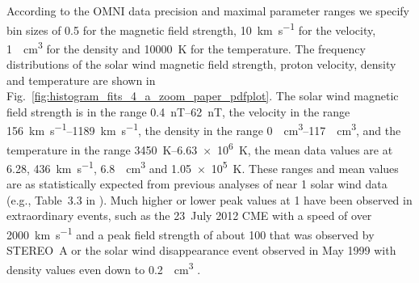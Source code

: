 According to the OMNI data precision and maximal parameter ranges we specify bin sizes of \SI{0.5}{\nT} for the magnetic field strength, \SI{10}{\km\per\s} for the velocity, \SI{1}{\per\cm\cubed} for the density and \SI{10000}{\K} for the temperature. The frequency distributions of the solar wind magnetic field strength, proton velocity, density and temperature are shown in Fig.~\ref{fig:histogram_fits_4_a_zoom_paper_pdfplot}.
The solar wind magnetic field strength is in the range \SIrange{0.4}{62}{nT}, the velocity in the range \SIrange{156}{1189}{\km\per\s}, the density in the range \SIrange{0}{117}{\per\cm\cubed}, and the temperature in the range \SIrange{3450}{6.63e6}{\K}, the mean data values are at \SI{6.28}{\nT}, \SI{436}{\km\per\s}, \SI{6.8}{\per\cm\cubed} and \SI{1.05e5}{\K}. These ranges and mean values are as statistically expected from previous analyses of near \SI{1}{\au} solar wind data (e.g., Table~3.3 in \citet[p.~39]{Bothmer2007}).
Much higher or lower peak values at \SI{1}{\au} have been observed in extraordinary events, such as the 23~July 2012 CME with a speed of over \SI{2000}{\km\per\s} and a peak field strength of about \SI{100}{\nT} that was observed by STEREO~A \citep{Russell2013} or the solar wind disappearance event observed in May 1999 with density values even down to \SI{0.2}{\per\cm\cubed} \citep{Lazarus2000}.

